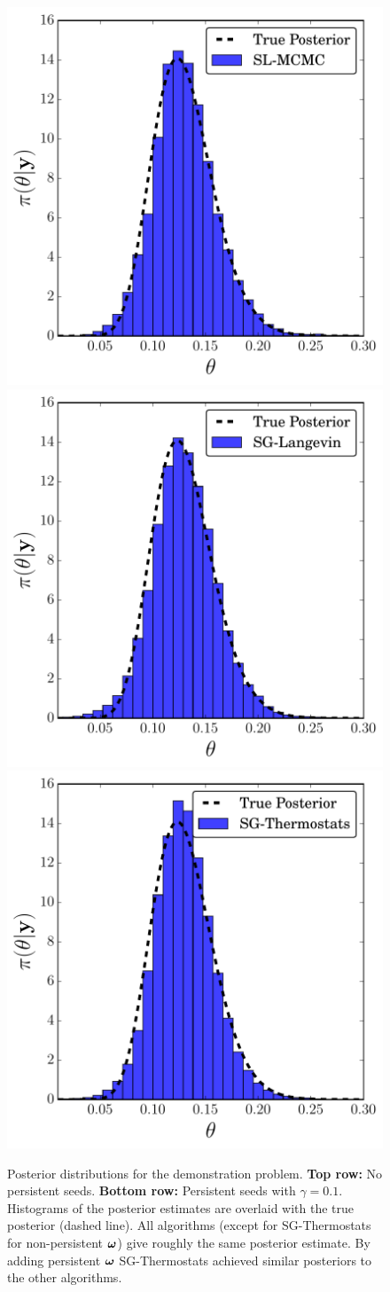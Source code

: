 \documentclass[]{article}
\begin{document}
\begin{figure}[t]
\begin{center}
\includegraphics[width=0.27\columnwidth]{./images/exponential/exp2-SL-MCMC-posterior-hist-omega-rate-0p1-chain1.pdf}
\includegraphics[width=0.27\columnwidth]{./images/exponential/exp2-SG-Langevin-posterior-hist-omega-rate-0p1-chain0.pdf}
\includegraphics[width=0.27\columnwidth]{./images/exponential/exp2-SG-Thermostats-posterior-hist-omega-rate-0p1-chain1.pdf}
\vspace{-0.1in}
\caption{\small{Posterior distributions for the demonstration problem.  {\bf Top row:} No persistent seeds.  {\bf Bottom row:} Persistent seeds with $\gamma=0.1$.  Histograms of the posterior estimates are overlaid with the true posterior (dashed line).  All algorithms (except for SG-Thermostats for non-persistent ${\bm \omega}$) give roughly the same posterior estimate.  By adding persistent ${\bm \omega}$ SG-Thermostats achieved similar posteriors to the other algorithms.}}
\label{fig:exp-posteriors}
\end{center}
\vspace{-0.1in}
\end{figure} 
%
\end{document}
